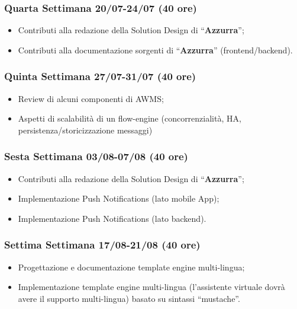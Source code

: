 \begin{trivlist}
\item \subsubsection{Quarta Settimana 20/07-24/07  (40 ore)}
\begin{itemize}
	\item Contributi alla redazione della Solution Design di “\textbf{Azzurra}”;
	\item Contributi alla documentazione sorgenti di “\textbf{Azzurra}” (frontend/backend).
\end{itemize}

\item \subsubsection{Quinta Settimana 27/07-31/07 (40 ore)}
\begin{itemize}
	\item Review di alcuni componenti di \gls{AWMS};
	\item Aspetti di scalabilità di un flow-engine (concorrenzialità, HA, persistenza/storicizzazione
	messaggi)
\end{itemize}

\item \subsubsection{Sesta Settimana 03/08-07/08 (40 ore)}
\begin{itemize}
	\item Contributi alla redazione della Solution Design di “\textbf{Azzurra}”;
	\item Implementazione Push Notifications (lato mobile App);
	\item Implementazione Push Notifications (lato backend).
\end{itemize}

\item \subsubsection{Settima Settimana 17/08-21/08 (40 ore)}
\begin{itemize}
	\item Progettazione e documentazione template engine multi-lingua;
	\item Implementazione template engine multi-lingua (l’assistente virtuale dovrà avere il supporto multi-lingua) basato su sintassi “mustache”.
\end{itemize}	


\end{trivlist}
